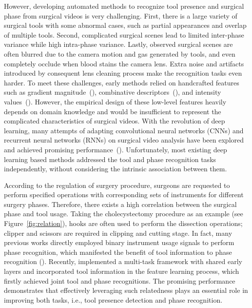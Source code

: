 \documentclass{elsarticle}
\begin{document}
However, developing automated methods to recognize tool presence and surgical phase from surgical videos is very challenging.
First, there is a large variety of surgical tools with some abnormal cases, such as partial appearances and overlap of multiple tools.
Second, complicated surgical scenes lead to limited inter-phase variance while high intra-phase variance. 
Lastly, observed surgical scenes are often blurred due to the camera motion and gas generated by tools, and even completely occlude when blood stains the camera lens.
Extra noise and artifacts introduced by consequent lens cleaning process make the recognition tasks even harder.
To meet these challenges, early methods relied on handcrafted features such as gradient magnitude~(\cite{blum2010modeling}), combinative descriptors~(\cite{lalys2012framework}), and intensity values~(\cite{zappella2013surgical}). 
However, the empirical design of these low-level features heavily depends on domain knowledge and would be insufficient to represent the complicated characteristics of surgical videos.
With the revolution of deep learning, many attempts of adapting convolutional neural networks (CNNs) and recurrent neural networks (RNNs) on surgical video analysis have been explored and achieved promising performance~(\cite{dipietro2016recognizing,sahu2017addressing,jin2018sv}). 
Unfortunately, most existing deep learning based methods addressed the tool and phase recognition tasks independently, without considering the intrinsic association between them.


According to the regulation of surgery procedure, surgeons are requested to perform specified operations with corresponding sets of instruments for different surgery phases.
Therefore, there exists a high correlation between the surgical phase and tool usage. 
Taking the cholecystectomy procedure as an example (see Figure~\ref{fig:relation}), hooks are often used to perform the dissection operations; clipper and scissors are required in clipping and cutting stage.
In fact, many previous works directly employed binary instrument usage signals to perform phase recognition, which manifested the benefit of tool information to phase recognition (\cite{padoy2012statistical,forestier2015automatic}).
Recently, \cite{twinanda2017endonet} implemented a multi-task framework with shared early layers and incorporated tool information in the feature learning process, which firstly achieved joint tool and phase recognitions.
The promising performance demonstrates that effectively leveraging such relatedness plays an essential role in improving both tasks, i.e., tool presence detection and phase recognition.
\end{document}
